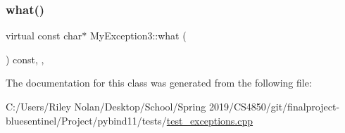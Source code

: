 \subsubsection{\texorpdfstring{what()}{what()}}
{\footnotesize\ttfamily virtual const char$\ast$ My\+Exception3\+::what (\begin{DoxyParamCaption}{ }\end{DoxyParamCaption}) const\hspace{0.3cm}{\ttfamily [inline]}, {\ttfamily [virtual]}, {\ttfamily [noexcept]}}



The documentation for this class was generated from the following file\+:\begin{DoxyCompactItemize}
\item 
C\+:/\+Users/\+Riley Nolan/\+Desktop/\+School/\+Spring 2019/\+C\+S4850/git/finalproject-\/bluesentinel/\+Project/pybind11/tests/\mbox{\hyperlink{test__exceptions_8cpp}{test\+\_\+exceptions.\+cpp}}\end{DoxyCompactItemize}
